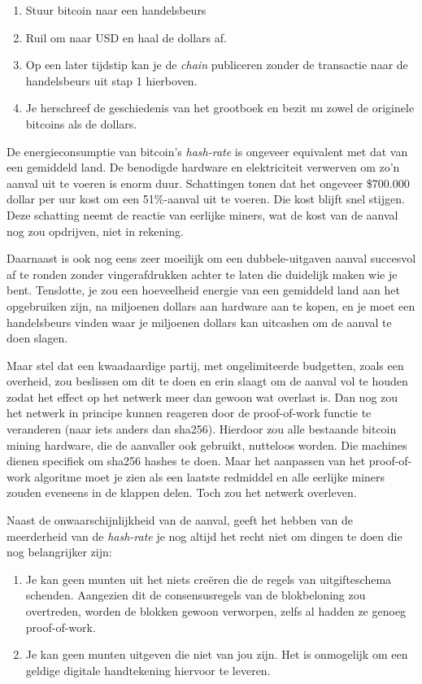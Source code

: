 \documentclass[smalldemyvopaper,11pt,twoside,onecolumn,openright,extrafontsizes]{memoir}
\begin{document}
\begin{enumerate}
\item Stuur bitcoin naar een handelsbeurs
\item Ruil om naar USD en haal de dollars af.
\item Op een later tijdstip kan je de\textit{ chain} publiceren zonder de transactie naar de handelsbeurs uit stap 1 hierboven.
\item Je herschreef de geschiedenis van het grootboek en bezit nu zowel de originele bitcoins als de dollars.
\end{enumerate}
De energieconsumptie van bitcoin’s \textit{hash-rate} is ongeveer equivalent met dat van een gemiddeld land. De benodigde hardware en elektriciteit verwerven om zo’n aanval uit te voeren is enorm duur. Schattingen tonen dat het ongeveer \$700.000 dollar per uur kost om een 51\%-aanval uit te voeren. Die kost blijft snel stijgen. Deze schatting neemt de reactie van eerlijke miners, wat de kost van de aanval nog zou opdrijven, niet in rekening.

Daarnaast is ook nog eens zeer moeilijk om een dubbele-uitgaven aanval succesvol af te ronden zonder vingerafdrukken achter te laten die duidelijk maken wie je bent. Tenslotte, je zou een hoeveelheid energie van een gemiddeld land aan het opgebruiken zijn, na miljoenen dollars aan hardware aan te kopen, en je moet een handelsbeurs vinden waar je miljoenen dollars kan uitcashen om de aanval te doen slagen.

Maar stel dat een kwaadaardige partij, met ongelimiteerde budgetten, zoals een overheid, zou beslissen om dit te doen en erin slaagt om de aanval vol te houden zodat het effect op het netwerk meer dan gewoon wat overlast is. Dan nog zou het netwerk in principe kunnen reageren door de proof-of-work functie te veranderen (naar iets anders dan sha256). Hierdoor zou alle bestaande bitcoin mining hardware, die de aanvaller ook gebruikt, nutteloos worden. Die machines dienen specifiek om sha256 hashes te doen. Maar het aanpassen van het proof-of-work algoritme moet je zien als een laatste redmiddel en alle eerlijke miners zouden eveneens in de klappen delen. Toch zou het netwerk overleven.

Naast de onwaarschijnlijkheid van de aanval, geeft het hebben van de meerderheid van de \textit{hash-rate} je nog altijd het recht niet om dingen te doen die nog belangrijker zijn:

\begin{enumerate}
    \item Je kan geen munten uit het niets creëren die de regels van uitgifteschema schenden. Aangezien dit de consensusregels van de blokbeloning zou overtreden, worden de blokken gewoon verworpen, zelfs al hadden ze genoeg proof-of-work.
    \item Je kan geen munten uitgeven die niet van jou zijn. Het is onmogelijk om een geldige digitale handtekening hiervoor te leveren.
\end{enumerate}
\end{document}
